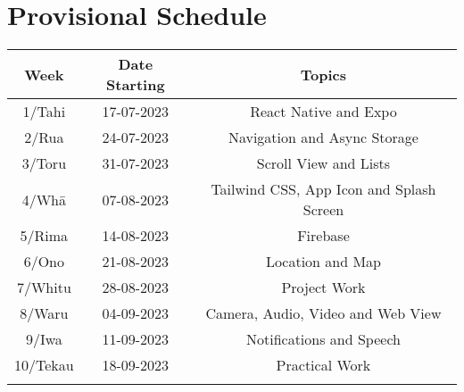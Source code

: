 \documentclass{article}
\begin{document}
\section*{Provisional Schedule}
\renewcommand{\arraystretch}{1.5}
\begin{tabular}{|c|c|c|c|}
	\hline
	\textbf{Week}                  & \textbf{Date Starting}            & \multicolumn{2}{c|}{\textbf{Topics}}                                                                                             \\ \hline
	\footnotesize 1/Tahi           & \footnotesize 17-07-2023 & \multicolumn{2}{c|}{\footnotesize React Native and Expo}    \\ \hline
	\footnotesize 2/Rua            & \footnotesize 24-07-2023 & \multicolumn{2}{c|}{\footnotesize Navigation and Async Storage}                   \\ \hline
	\footnotesize 3/Toru           & \footnotesize 31-07-2023 & \multicolumn{2}{c|}{\footnotesize Scroll View and Lists} \\ \hline
	\footnotesize 4/Whā            & \footnotesize 07-08-2023 & \multicolumn{2}{c|}{\footnotesize Tailwind CSS, App Icon and Splash Screen}                               \\ \hline
	\footnotesize 5/Rima           & \footnotesize 14-08-2023 & \multicolumn{2}{c|}{\footnotesize Firebase}                                                \\ \hline
	\footnotesize 6/Ono            & \footnotesize 21-08-2023  & \multicolumn{2}{c|}{\footnotesize Location and Map}                                                    \\ \hline
	\footnotesize 7/Whitu          & \footnotesize 28-08-2023 &  \multicolumn{2}{c|}{\footnotesize Project Work}                            \\ \hline
	\footnotesize 8/Waru   & \footnotesize 04-09-2023 & \multicolumn{2}{c|}{\footnotesize Camera, Audio, Video and Web View}                                                   \\ \hline
	\footnotesize 9/Iwa            & \footnotesize 11-09-2023 & \multicolumn{2}{c|}{\footnotesize Notifications and Speech}                                                                 \\ \hline
	\footnotesize 10/Tekau         & \footnotesize 18-09-2023 & \multicolumn{2}{c|}{\footnotesize Practical Work}                                                                 \\ \hline
	\rowcolor{yellow} \multicolumn{4}{|c|}{\footnotesize Mid Term Break}                                                                                                                         \\ \hline

\end{tabular}
\end{document}
